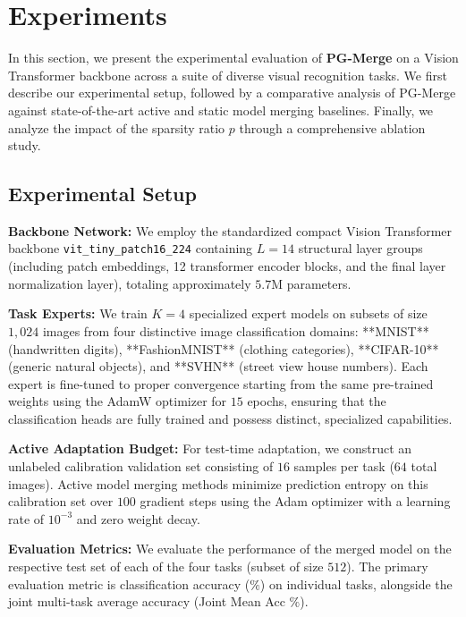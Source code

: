 \section{Experiments}
\label{sec:experiments}

In this section, we present the experimental evaluation of \textbf{PG-Merge} on a Vision Transformer backbone across a suite of diverse visual recognition tasks. We first describe our experimental setup, followed by a comparative analysis of PG-Merge against state-of-the-art active and static model merging baselines. Finally, we analyze the impact of the sparsity ratio $p$ through a comprehensive ablation study.

\subsection{Experimental Setup}
\textbf{Backbone Network:} We employ the standardized compact Vision Transformer backbone \texttt{vit\_tiny\_patch16\_224} containing $L = 14$ structural layer groups (including patch embeddings, 12 transformer encoder blocks, and the final layer normalization layer), totaling approximately $5.7$M parameters.

\textbf{Task Experts:} We train $K = 4$ specialized expert models on subsets of size $1,024$ images from four distinctive image classification domains: **MNIST** (handwritten digits), **FashionMNIST** (clothing categories), **CIFAR-10** (generic natural objects), and **SVHN** (street view house numbers). Each expert is fine-tuned to proper convergence starting from the same pre-trained weights using the AdamW optimizer for $15$ epochs, ensuring that the classification heads are fully trained and possess distinct, specialized capabilities.

\textbf{Active Adaptation Budget:} For test-time adaptation, we construct an unlabeled calibration validation set consisting of $16$ samples per task ($64$ total images). Active model merging methods minimize prediction entropy on this calibration set over $100$ gradient steps using the Adam optimizer with a learning rate of $10^{-3}$ and zero weight decay.

\textbf{Evaluation Metrics:} We evaluate the performance of the merged model on the respective test set of each of the four tasks (subset of size $512$). The primary evaluation metric is classification accuracy ($\%$) on individual tasks, alongside the joint multi-task average accuracy (Joint Mean Acc $\%$).

